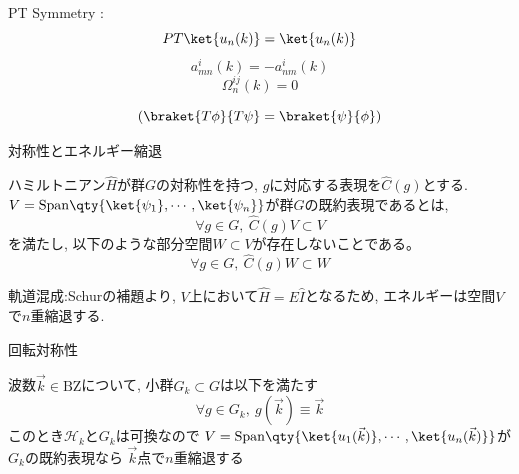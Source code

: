 \documentclass[a4paper,12pt]{jlreq}
\begin{document}
PT Symmetry :
\begin{equation*}
    PT\ket{u_n(k)} = \ket{u_n(k)}
\end{equation*}
\begin{equation*}
    a^{i}_{mn}(k) = -a^{i}_{nm}(k)
\end{equation*}
\begin{equation*}
    \Omega^{ij}_n(k) =  0
\end{equation*}

\begin{equation*}
    (\braket{T\phi}{T\psi} = \braket{\psi}{\phi})
\end{equation*}

\newpage
\large{対称性とエネルギー縮退}

ハミルトニアン$\hat{H}$が群$G$の対称性を持つ, $g$に対応する表現を$\hat{C}(g)$とする.
$V = \mathrm{Span}\qty{\ket{\psi_1}, \cdots ,\ket{\psi_n}}$が群$G$の既約表現であるとは,
\begin{equation*}
    \forall g \in G,\ \hat{C}(g) V \subset V
\end{equation*}
を満たし, 以下のような部分空間$W \subset V$が存在しないことである。
\begin{equation*}
    \forall g \in G,\ \hat{C}(g) W \subset W
\end{equation*}

軌道混成:Schurの補題より, $V$上において$\hat{H}=E\hat{I}$となるため, エネルギーは空間$V$で$n$重縮退する.

\newpage
\large{回転対称性}

波数$\vec{k}\in \mathrm{BZ}$について, 小群$G_k \subset G$は以下を満たす
\begin{equation*}
    \forall g \in G_k,\ g(\vec{k}) \equiv \vec{k}
\end{equation*}
このとき$\mathcal{H}_k$と$G_k$は可換なので
$V = \mathrm{Span}\qty{\ket{u_1(\vec{k})}, \cdots ,\ket{u_n(\vec{k})}}$が$G_k$の既約表現なら
$\vec{k}$点で$n$重縮退する
\end{document}
